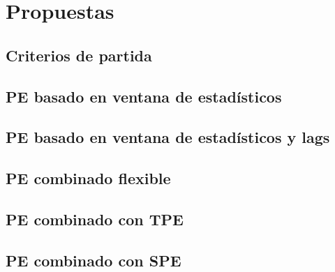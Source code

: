 \section{Propuestas}
\subsection{Criterios de partida}
\subsection{PE basado en ventana de estadísticos}
\subsection{PE basado en ventana de estadísticos y lags}
\subsection{PE combinado flexible}
\subsection{PE combinado con TPE}
\subsection{PE combinado con SPE}


